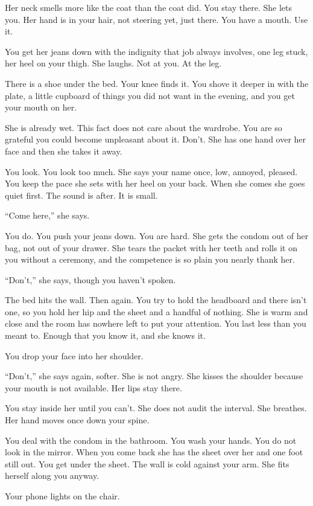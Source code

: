 \documentclass[11pt,oneside]{book}
\begin{document}
Her neck smells more like the coat than the coat did. You stay there. She lets you. Her hand is in your hair, not steering yet, just there. You have a mouth. Use it.

You get her jeans down with the indignity that job always involves, one leg stuck, her heel on your thigh. She laughs. Not at you. At the leg.

There is a shoe under the bed. Your knee finds it. You shove it deeper in with the plate, a little cupboard of things you did not want in the evening, and you get your mouth on her.

She is already wet. This fact does not care about the wardrobe. You are so grateful you could become unpleasant about it. Don't. She has one hand over her face and then she takes it away.

You look. You look too much. She says your name once, low, annoyed, pleased. You keep the pace she sets with her heel on your back. When she comes she goes quiet first. The sound is after. It is small.

``Come here,'' she says.

You do. You push your jeans down. You are hard. She gets the condom out of her bag, not out of your drawer. She tears the packet with her teeth and rolls it on you without a ceremony, and the competence is so plain you nearly thank her.

``Don't,'' she says, though you haven't spoken.

The bed hits the wall. Then again. You try to hold the headboard and there isn't one, so you hold her hip and the sheet and a handful of nothing. She is warm and close and the room has nowhere left to put your attention. You last less than you meant to. Enough that you know it, and she knows it.

You drop your face into her shoulder.

``Don't,'' she says again, softer. She is not angry. She kisses the shoulder because your mouth is not available. Her lips stay there.

You stay inside her until you can't. She does not audit the interval. She breathes. Her hand moves once down your spine.

You deal with the condom in the bathroom. You wash your hands. You do not look in the mirror. When you come back she has the sheet over her and one foot still out. You get under the sheet. The wall is cold against your arm. She fits herself along you anyway.

Your phone lights on the chair.
\end{document}
